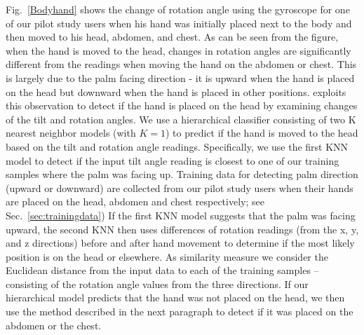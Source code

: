   Fig.~\ref{Bodyhand} shows the change of rotation angle using the gyroscope for one of our pilot study users
when his hand was initially placed next to the body and then moved to his head, abdomen, and chest. As can be seen from the figure, when
the hand is moved to the head, changes in rotation angles are significantly different from the readings when moving the hand on the abdomen or
chest. This is largely due to the palm facing direction - it is upward when the hand is placed on the head but downward when the hand is
placed in other positions. {\systemname} exploits this observation to detect if the hand is placed on the head by examining changes of the
{tilt} and rotation angles. We use a hierarchical classifier consisting of two {K nearest neighbor} models (with $K=1$) to predict if the
hand is moved to the head based on the tilt and rotation angle readings. Specifically, we use the first KNN model to detect if the input
tilt angle reading is closest to one of our training samples where the palm was {facing up. Training data for detecting palm direction
(upward or downward) are collected} from our pilot study users when their hands are placed on the head, abdomen and  chest respectively;
see Sec.~\ref{sec:trainingdata}) If the first KNN model suggests that the palm was facing upward, the second KNN then uses differences of
rotation readings (from the x, y, and z directions) before and after hand movement to determine if the most likely position is on the head
or elsewhere. As similarity measure we consider the  Euclidean distance from the input data to each of the training samples -- consisting
of the rotation angle values from the three directions. If our hierarchical model predicts that the hand was not placed on the head, we
then use the method described in the next paragraph to detect if it was placed on the abdomen or the chest.

